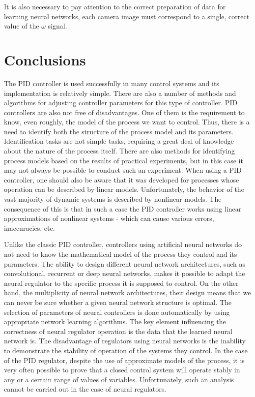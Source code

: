 \documentclass[conference]{IEEEtran}
\begin{document}
It is also necessary to pay attention to the correct preparation of data for learning neural networks, each camera image must correspond to a single, correct value of the $\omega$ signal.


\section{Conclusions}\label{sec:conclusion}
The PID controller is used successfully in many control systems and its implementation is relatively simple. There are also a number of methods and algorithms for adjusting controller parameters for this type of controller. PID controllers are also not free of disadvantages. One of them is the requirement to know, even roughly, the model of the process we want to control. Thus, there is a need to identify both the structure of the process model and its parameters. Identification tasks are not simple tasks, requiring a great deal of knowledge about the nature of the process itself. There are also methods for identifying process models based on the results of practical experiments, but in this case it may not always be possible to conduct such an experiment. When using a PID controller, one should also be aware that it was developed for processes whose operation can be described by linear models. Unfortunately, the behavior of the vast majority of dynamic systems is described by nonlinear models. The consequence of this is that in such a case the PID controller works using linear approximations of nonlinear systems - which can cause various errors, inaccuracies, etc.

Unlike the classic PID controller, controllers using artificial neural networks do not need to know the mathematical model of the process they control and its parameters. The ability to design different neural network architectures, such as convolutional, recurrent or deep neural networks, makes it possible to adapt the neural regulator to the specific process it is supposed to control. On the other hand, the multiplicity of neural network architectures, their design means that we can never be sure whether a given neural network structure is optimal.
The selection of parameters of neural controllers is done automatically by using appropriate network learning algorithms.  The key element influencing the correctness of neural regulator operation is the data that the learned neural network is. The disadvantage of regulators using neural networks is the inability to demonstrate the stability of operation of the systems they control. In the case of the PID regulator, despite the use of approximate models of the process, it is very often possible to prove that a closed control system will operate stably in any or a certain range of values of variables. Unfortunately, such an analysis cannot be carried out in the case of neural regulators. 
\end{document}
